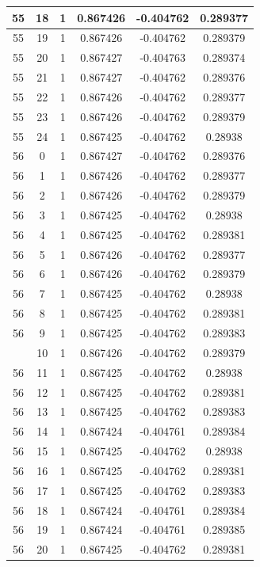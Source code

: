 \documentclass[12pt,a4paper]{article}
\numberwithin{equation}{section}
\numberwithin{figure}{section}
\numberwithin{table}{section}
\begin{document}
\begin{longtable}{|c|c|c|c|c|c|}
55 & 18 & 1 & 0.867426 & -0.404762 & 0.289377 \\ \hline
55 & 19 & 1 & 0.867426 & -0.404762 & 0.289379 \\ \hline
55 & 20 & 1 & 0.867427 & -0.404763 & 0.289374 \\ \hline
55 & 21 & 1 & 0.867427 & -0.404762 & 0.289376 \\ \hline
55 & 22 & 1 & 0.867426 & -0.404762 & 0.289377 \\ \hline
55 & 23 & 1 & 0.867426 & -0.404762 & 0.289379 \\ \hline
55 & 24 & 1 & 0.867425 & -0.404762 & 0.28938 \\ \hline
56 & 0 & 1 & 0.867427 & -0.404762 & 0.289376 \\ \hline
56 & 1 & 1 & 0.867426 & -0.404762 & 0.289377 \\ \hline
56 & 2 & 1 & 0.867426 & -0.404762 & 0.289379 \\ \hline
56 & 3 & 1 & 0.867425 & -0.404762 & 0.28938 \\ \hline
56 & 4 & 1 & 0.867425 & -0.404762 & 0.289381 \\ \hline
56 & 5 & 1 & 0.867426 & -0.404762 & 0.289377 \\ \hline
56 & 6 & 1 & 0.867426 & -0.404762 & 0.289379 \\ \hline
56 & 7 & 1 & 0.867425 & -0.404762 & 0.28938 \\ \hline
56 & 8 & 1 & 0.867425 & -0.404762 & 0.289381 \\ \hline
56 & 9 & 1 & 0.867425 & -0.404762 & 0.289383 \\ \hline
\pagebreak
56 & 10 & 1 & 0.867426 & -0.404762 & 0.289379 \\ \hline
56 & 11 & 1 & 0.867425 & -0.404762 & 0.28938 \\ \hline
56 & 12 & 1 & 0.867425 & -0.404762 & 0.289381 \\ \hline
56 & 13 & 1 & 0.867425 & -0.404762 & 0.289383 \\ \hline
56 & 14 & 1 & 0.867424 & -0.404761 & 0.289384 \\ \hline
56 & 15 & 1 & 0.867425 & -0.404762 & 0.28938 \\ \hline
56 & 16 & 1 & 0.867425 & -0.404762 & 0.289381 \\ \hline
56 & 17 & 1 & 0.867425 & -0.404762 & 0.289383 \\ \hline
56 & 18 & 1 & 0.867424 & -0.404761 & 0.289384 \\ \hline
56 & 19 & 1 & 0.867424 & -0.404761 & 0.289385 \\ \hline
56 & 20 & 1 & 0.867425 & -0.404762 & 0.289381 \\ \hline

\end{longtable}
\end{document}
